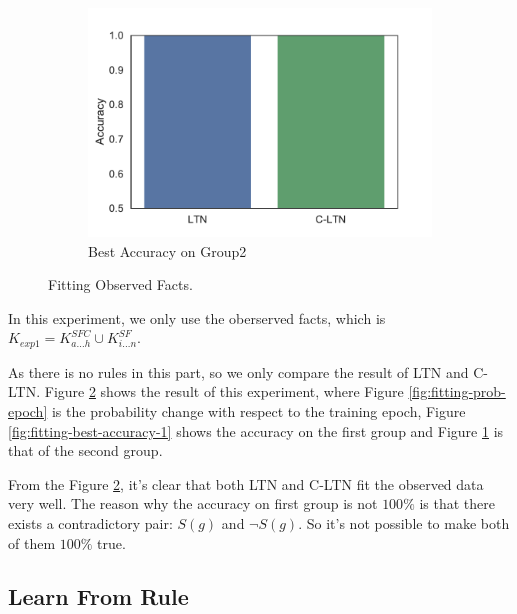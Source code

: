 \begin{figure}[!]
\begin{subfigure}[]{0.33\textwidth}
    \end{subfigure}~~~~
    \begin{subfigure}[]{0.33\textwidth}
        \includegraphics[width=\textwidth]{img/bar2.pdf}
        \caption{Best Accuracy on Group2}
        \label{fig:fitting-best-accuracy-2}
    \end{subfigure}
    \caption{Fitting Observed Facts.}
    \label{fig:fitting}
\end{figure}

In this experiment, we only use the oberserved facts, which is $K_{exp1} = K^{SFC}_{a \dots h} \cup K^{SF}_{i\dots n}$.

As there is no rules in this part, so we only compare the result of LTN and C-LTN.
Figure \ref{fig:fitting} shows the result of this experiment, where Figure \ref{fig:fitting-prob-epoch} is the probability change with respect to the training epoch, Figure \ref{fig:fitting-best-accuracy-1} shows the accuracy on the first group and Figure \ref{fig:fitting-best-accuracy-2} is that of the second group.

From the Figure \ref{fig:fitting}, it's clear that both LTN and C-LTN fit the observed data very well. The reason why the accuracy on first group is not $100\%$ is that there exists a contradictory pair: $S(g)$ and $\neg S(g)$. So it's not possible to make both of them $100\%$ true.


\subsection{Learn From Rule}

